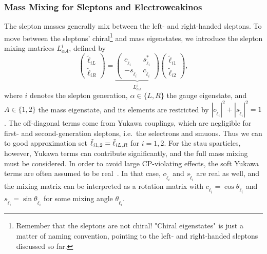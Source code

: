 \subsubsection{Mass Mixing for Sleptons and Electroweakinos}
The slepton masses generally mix between the left- and right-handed sleptons. To move between the sleptons' chiral\footnote{Remember that the sleptons are not chiral! "Chiral eigenstates" is just a matter of naming convention, pointing to the left- and right-handed sleptons discussed so far.} and mass eigenstates, we introduce the slepton mixing matrices $L^i_{\alpha A}$, defined by
\begin{equation}\label{eq:slepton_mass_mixing}
    \begin{pmatrix}
        \tilde\ell_{iL} \\ \tilde\ell_{iR}
    \end{pmatrix} = \underbrace{\begin{pmatrix}
        c_{\tilde\ell_i} & s_{\tilde\ell_i}^* \\
        -s_{\tilde\ell_i} & c_{\tilde\ell_i}
    \end{pmatrix}}_{L^i_{\alpha A}} \begin{pmatrix}
        \tilde\ell_{i1} \\ \tilde\ell_{i2}
    \end{pmatrix},
\end{equation}
where $i$ denotes the slepton generation, $\alpha\in\{L,R\}$ the gauge eigenstate, and $A\in\{1,2\}$ the mass eigenstate, and its elements are restricted by $|c_{\tilde\ell_i}|^2+|s_{\tilde\ell_i}|^2=1$.
The off-diagonal terms come from Yukawa couplings, which are negligible for first- and second-generation sleptons, i.e.\ the selectrons and smuons. Thus we can to good approximation set ${\tilde{\ell}}_{i1,2} = {\tilde{\ell}}_{iL,R}$ for $i=1,2$.
For the stau sparticles, however, Yukawa terms can contribute significantly, and the full mass mixing must be considered.
In order to avoid large CP-violating effects, the soft Yukawa terms are often assumed to be real~\cite{Martin:1997ns}.
In that case, $c_{\tilde\ell_i}$ and $s_{\tilde\ell_i}$ are real as well, and the mixing matrix can be interpreted as a rotation matrix with $c_{\tilde\ell_i}=\cos\theta_{\tilde\ell_i}$ and $s_{\tilde\ell_i}=\sin\theta_{\tilde\ell_i}$ for some mixing angle $\theta_{\tilde\ell_i}$.

